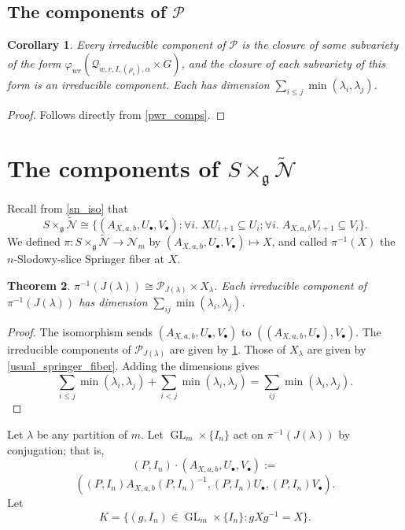 \documentclass[12pt,psamsfonts]{article}
\DeclareMathOperator{\GL}{GL}
\newtheorem{theorem}{Theorem}[section]
\newtheorem{corollary}[theorem]{Corollary}
\begin{document}
\subsection{The components of \texorpdfstring{\(\mathcal{P}\)}{P}}
\begin{corollary}\label{p_comps}
    Every irreducible component of \(\mathcal{P}\) is the closure of some subvariety of the form \(\varphi_{wr}(\mathcal{Q}_{w,r,I,(\rho_i),\alpha} \times G)\), and the closure of each subvariety of this form is an irreducible component.
    Each has dimension \(\sum_{i \leq j} \min(\lambda_i, \lambda_j)\).
\end{corollary}
\begin{proof}
    Follows directly from \cref{pwr_comps}.
\end{proof}

\section{The components of \texorpdfstring{\(S \times_\mathfrak{g} \widetilde{\mathcal{N}}\)}{S x\_g N}}\label{sxn_comps}
Recall from \cref{sn_iso} that 
\[S \times_\mathfrak{g} \widetilde{\mathcal{N}} \cong \{(A_{X,a,b}, U_\bullet, V_\bullet) : \forall i. \; XU_{i + 1} \subseteq U_i; \forall i. \; A_{X,a,b} V_{i + 1} \subseteq V_i\}.\]
We defined \(\pi : S \times_\mathfrak{g} \widetilde{\mathcal{N}} \to \mathcal{N}_m\) by \((A_{X,a,b}, U_\bullet, V_\bullet) \mapsto X\), and called \(\pi^{-1}(X)\) the \(n\)-Slodowy-slice Springer fiber at \(X\).
\begin{theorem}\label{springer_fiber_comps}
    \(\pi^{-1}(J(\lambda)) \cong \mathcal{P}_{J(\lambda)} \times X_\lambda\).
    Each irreducible component of \(\pi^{-1}(J(\lambda))\) has dimension \(\sum_{ij} \min(\lambda_i, \lambda_j)\).
\end{theorem}
\begin{proof}
    The isomorphism sends \((A_{X,a,b}, U_\bullet, V_\bullet)\) to \(((A_{X, a, b}, U_\bullet), V_\bullet)\).
    The irreducible components of \(\mathcal{P}_{J(\lambda)}\) are given by \cref{p_comps}.
    Those of \(X_\lambda\) are given by \cref{usual_springer_fiber}.
    Adding the dimensions gives 
    \[\sum_{i \leq j} \min(\lambda_i, \lambda_j) + \sum_{i < j} \min(\lambda_i, \lambda_j) = \sum_{ij} \min(\lambda_i, \lambda_j).\]
\end{proof}

Let \(\lambda\) be any partition of \(m\).
Let \(\GL_m \times \{I_n\}\) act on \(\pi^{-1}(J(\lambda))\) by conjugation; that is,
\[(P, I_n) \cdot (A_{X, a, b}, U_\bullet, V_\bullet) := \]
\[((P,I_n)A_{X,a,b}(P,I_n)^{-1},(P,I_n)U_\bullet, (P,I_n)V_\bullet).\]
Let 
\[K = \{(g, I_n) \in \GL_m \times \{I_n\} : gXg^{-1} = X\}.\]
\end{document}
